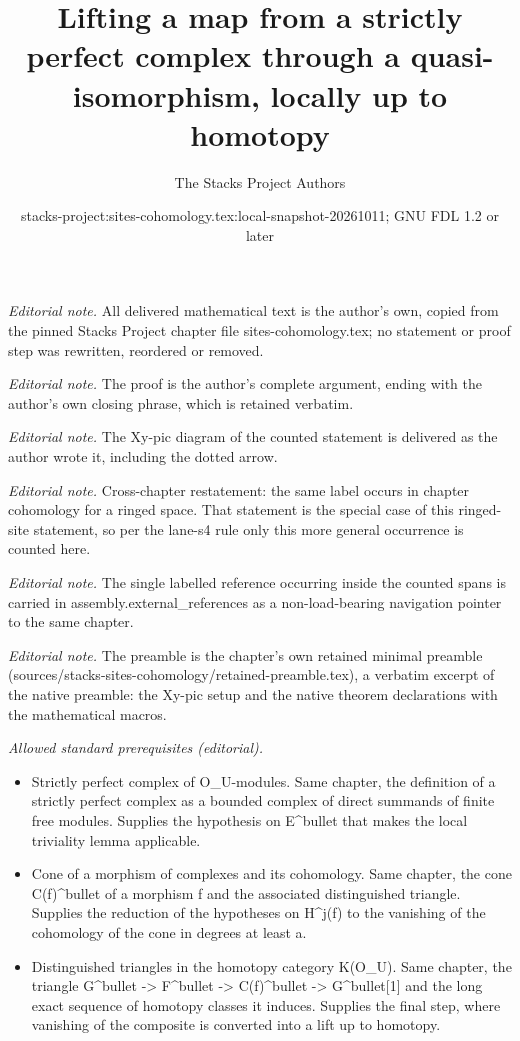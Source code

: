 \documentclass[10pt,a4paper]{amsart}
\title{Lifting a map from a strictly perfect complex through a quasi-isomorphism, locally up to homotopy}
\author{The Stacks Project Authors}
\date{stacks-project:sites-cohomology.tex:local-snapshot-20261011; GNU FDL 1.2 or later}
\theoremstyle{plain}
\theoremstyle{definition}
\theoremstyle{remark}
\numberwithin{equation}{subsection}
\begin{document}
\maketitle
\noindent\textit{Editorial note.} All delivered mathematical text is the author's own, copied from the pinned Stacks Project chapter file sites-cohomology.tex; no statement or proof step was rewritten, reordered or removed.\par\medskip
\noindent\textit{Editorial note.} The proof is the author's complete argument, ending with the author's own closing phrase, which is retained verbatim.\par\medskip
\noindent\textit{Editorial note.} The Xy-pic diagram of the counted statement is delivered as the author wrote it, including the dotted arrow.\par\medskip
\noindent\textit{Editorial note.} Cross-chapter restatement: the same label occurs in chapter cohomology for a ringed space. That statement is the special case of this ringed-site statement, so per the lane-s4 rule only this more general occurrence is counted here.\par\medskip
\noindent\textit{Editorial note.} The single labelled reference occurring inside the counted spans is carried in assembly.external\_references as a non-load-bearing navigation pointer to the same chapter.\par\medskip
\noindent\textit{Editorial note.} The preamble is the chapter's own retained minimal preamble (sources/stacks-sites-cohomology/retained-preamble.tex), a verbatim excerpt of the native preamble: the Xy-pic setup and the native theorem declarations with the mathematical macros.\par\medskip
\noindent\textit{Allowed standard prerequisites (editorial).}\begin{itemize}
\item Strictly perfect complex of O\_U-modules. Same chapter, the definition of a strictly perfect complex as a bounded complex of direct summands of finite free modules. Supplies the hypothesis on E\textasciicircum{}bullet that makes the local triviality lemma applicable.
\item Cone of a morphism of complexes and its cohomology. Same chapter, the cone C(f)\textasciicircum{}bullet of a morphism f and the associated distinguished triangle. Supplies the reduction of the hypotheses on H\textasciicircum{}j(f) to the vanishing of the cohomology of the cone in degrees at least a.
\item Distinguished triangles in the homotopy category K(O\_U). Same chapter, the triangle G\textasciicircum{}bullet -> F\textasciicircum{}bullet -> C(f)\textasciicircum{}bullet -> G\textasciicircum{}bullet[1] and the long exact sequence of homotopy classes it induces. Supplies the final step, where vanishing of the composite is converted into a lift up to homotopy.
\end{itemize}\medskip
\end{document}
